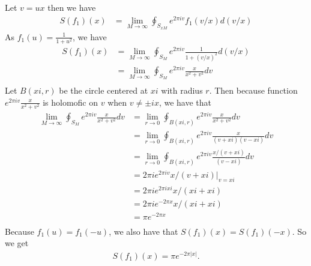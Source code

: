 \documentclass[pdf]{article}
\begin{document}
\begin{itemize}
Let $v = ux$ then we have 
\begin{align}\label{Question7integral}
S(f_1)(x) &= \lim\limits_{M\to\infty}\oint_{S_{xM}}e^{2\pi iv}f_1(v/x)d(v/x)
\end{align}
As $f_1(u) = \frac{1}{1+u^2}$, we have 
\begin{align*}
S(f_1)(x) &= \lim\limits_{M\to\infty}\oint_{S_{M}}e^{2\pi iv}\frac{1}{1+(v/x)^2}d(v/x)\\
                &= \lim\limits_{M\to\infty}\oint_{S_{M}}e^{2\pi iv}\frac{x}{x^2+v^2}dv\\
\end{align*}
Let $B(xi, r)$ be the circle centered at $xi$ with radius $r$. Then because function $e^{2\pi iv}\frac{x}{x^2+v^2}$ is holomofic on $v$ when $v\neq \pm ix$, we have that 
\begin{align*}
\lim\limits_{M\to\infty}\oint_{S_{M}}e^{2\pi iv}\frac{x}{x^2+v^2}dv &= \lim\limits_{r\to0}\oint_{B(xi, r)}e^{2\pi iv}\frac{x}{x^2+v^2}dv\\
                                                                                                                 &= \lim\limits_{r\to0}\oint_{B(xi, r)}e^{2\pi iv}\frac{x}{(v+xi)(v-xi)}dv\\
                                                                                                                 &= \lim\limits_{r\to0}\oint_{B(xi, r)}e^{2\pi iv}\frac{x/(v+xi)}{(v-xi)}dv\\
                                                                                                                 &= 2\pi ie^{2\pi iv}x/(v+xi)|_{v=xi}\\
                                                                                                                 &= 2\pi ie^{2\pi ixi}x/(xi+xi)\\
                                                                                                                 &= 2\pi ie^{-2\pi x}x/(xi+xi)\\
                                                                                                                 &= \pi e^{-2\pi x}\\
\end{align*}
Because $f_1(u) = f_1(-u)$, we also have that $S(f_1)(x) = S(f_1)(-x)$. So we get
\begin{align*}
S(f_1)(x) = \pi e^{-2\pi |x|}.
\end{align*}


\end{itemize}
\end{document}
